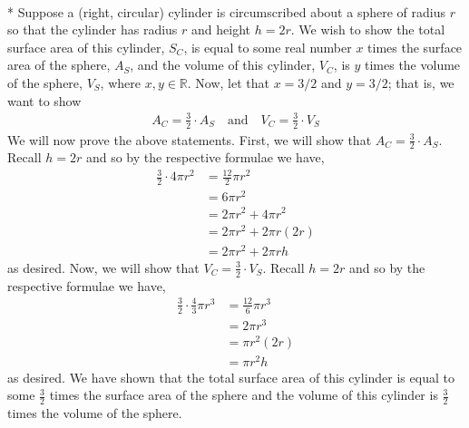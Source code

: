 \documentclass[10pt]{article}
\makeatletter
\newcommand{\R}{\mathbb{R}}
\newenvironment{question}[2][Question]{\begin{trivlist}
\item[\hskip \labelsep {\bfseries #1}\hskip \labelsep {\bfseries #2.}]}{\end{trivlist}}
\renewenvironment{proof}[1][\proofname]{\par
\pushQED{\qed}
\normalfont \topsep6\p@\@plus6\p@\relax
\trivlist
\item[\hskip\labelsep\itshape#1\@addpunct{.}]\mbox{}\\*}{\popQED\endtrivlist\@endpefalse}
\makeatother
\begin{document}
\begin{question}{3}
	\begin{proof}
		Suppose a (right, circular) cylinder is circumscribed about a sphere of radius $r$ so that the cylinder has radius $r$ and height $h = 2r$. We wish to show the total surface area of this cylinder, $S_C$, is equal to some real number $x$ times the surface area of the sphere, $A_S$, and the volume of this cylinder, $V_C$, is $y$ times the volume of the sphere, $V_S$, where $x,y \in \R$. Now, let that $x = 3/2$ and $y = 3/2$; that is, we want to show
		\begin{align*}
			A_C = \frac{3}{2} \cdot A_S \quad \text{and} \quad V_C = \frac{3}{2} \cdot V_S
		\end{align*} We will now prove the above statements. First, we will show that $A_C = \frac 3 2 \cdot A_S$. Recall $h = 2r$ and so by the respective formulae we have,
		\begin{align*}
			\frac 3 2 \cdot 4 \pi r^{2} & = \frac {12}{2} \pi r^{2}    \\
			                            & = 6 \pi r^{2}                \\
			                            & = 2 \pi r^{2}  + 4 \pi r^{2} \\
			                            & = 2 \pi r^{2}  + 2 \pi r(2r) \\
			                            & = 2 \pi r^{2}  + 2 \pi rh
		\end{align*}
		as desired. Now, we will show that $V_C = \frac 3 2 \cdot V_S$. Recall $h = 2r$ and so by the respective formulae we have,
		\begin{align*}
			\frac 3 2 \cdot \frac 4 3 \pi r^3 & = \frac{12}{6} \pi r^3 \\
			                                  & = 2 \pi r^3            \\
			                                  & = \pi r^2 (2r)         \\
			                                  & = \pi r^2 h
		\end{align*}
		as desired. We have shown that the total surface area of this cylinder is equal to some $\frac 3 2$ times the surface area of the sphere and the volume of this cylinder is $\frac 3 2$ times the volume of the sphere.
	\end{proof}
\end{question}

\vspace{5mm}
\end{document}

